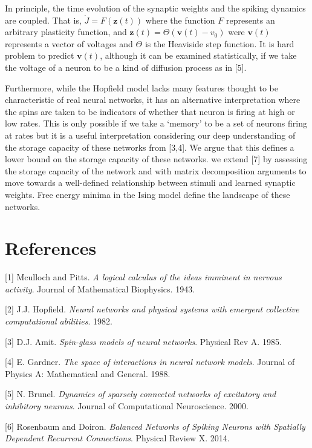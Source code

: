 \documentclass{article} %
\begin{document}
In principle, the time evolution of the synaptic weights and the spiking dynamics are coupled. That is, $\dot{J} = F(\mathbf{z}(t))$ where the function $F$ represents an arbitrary plasticity function, and $\mathbf{z}(t) = \Theta(\mathbf{v}(t)-v_{0})$ were $\mathbf{v}(t)$ represents a vector of voltages and $\Theta$ is the Heaviside step function. It is hard problem to predict $\mathbf{v}(t)$, although it can be examined statistically, if we take the voltage of a neuron to be a kind of diffusion process as in [5]. 

Furthermore, while the Hopfield model lacks many features thought to be characteristic of real neural networks, it has an alternative interpretation where the spins are taken to be indicators of whether that neuron is firing at high or low rates. This is only possible if we take a `memory' to be a set of neurons firing at rates but it is a useful interpretation considering our deep understanding of the storage capacity of these networks from [3,4]. We argue that this defines a lower bound on the storage capacity of these networks. we extend [7] by assessing the storage capacity of the network and with matrix decomposition arguments to move towards a well-defined relationship between stimuli and learned synaptic weights. Free energy minima in the Ising model define the landscape of these networks.



\section*{References}

[1] Mculloch and Pitts. \textit{A logical calculus of the ideas imminent in nervous activity}. Journal of Mathematical Biophysics. 1943.

[2] J.J. Hopfield. \textit{Neural networks and physical systems with emergent collective computational abilities}. 1982.

[3] D.J. Amit. \textit{Spin-glass models of neural networks}. Physical Rev A. 1985.

[4] E. Gardner. \textit{The space of interactions in neural network models}. Journal of Physics A: Mathematical and General. 1988.

[5] N. Brunel. \textit{Dynamics of sparsely connected networks of excitatory and inhibitory neurons}. Journal of Computational Neuroscience. 2000. 

[6] Rosenbaum and Doiron. \textit{Balanced Networks of Spiking Neurons with Spatially Dependent Recurrent Connections}. Physical Review X. 2014.
\end{document}
